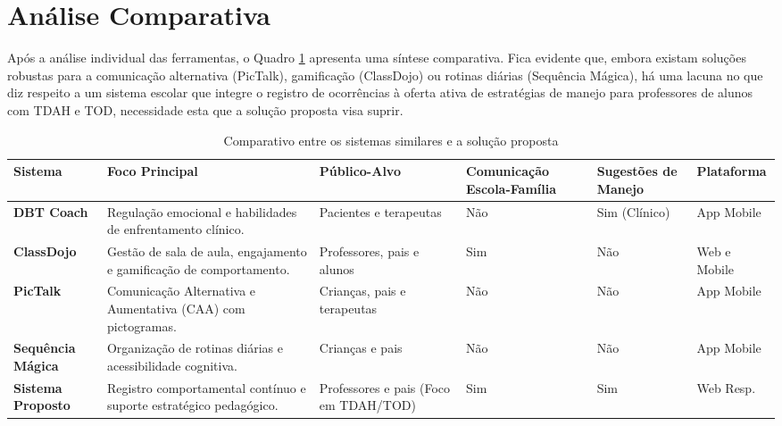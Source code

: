 \section{Análise Comparativa}

Após a análise individual das ferramentas, o Quadro \ref{quadro:comparativo_sistemas} apresenta uma síntese comparativa. Fica evidente que, embora existam soluções robustas para a comunicação alternativa (PicTalk), gamificação (ClassDojo) ou rotinas diárias (Sequência Mágica), há uma lacuna no que diz respeito a um sistema escolar que integre o registro de ocorrências à oferta ativa de estratégias de manejo para professores de alunos com TDAH e TOD, necessidade esta que a solução proposta visa suprir.

\begin{table}[H]
    \centering
    \caption{Comparativo entre os sistemas similares e a solução proposta}
    \label{quadro:comparativo_sistemas}
    \renewcommand{\arraystretch}{1.4} 
    \setlength{\tabcolsep}{3pt}
    \small 

    \begin{tabular}{|p{2.4cm}|p{3.8cm}|p{2.5cm}|p{2.4cm}|p{2.0cm}|p{1.8cm}|}
        \hline
        \textbf{Sistema} & \textbf{Foco Principal} & \textbf{Público-Alvo} & \textbf{Comunicação \newline Escola-Família} & \textbf{Sugestões \newline de Manejo} & \textbf{Plataforma} \\ \hline
        
        \textbf{DBT Coach} & Regulação emocional e habilidades de enfrentamento clínico. & Pacientes e terapeutas & Não & Sim (Clínico) & App Mobile \\ \hline
        
        \textbf{ClassDojo} & Gestão de sala de aula, engajamento e gamificação de comportamento. & Professores, pais e alunos & Sim & Não & Web e Mobile \\ \hline
        
        \textbf{PicTalk} & Comunicação Alternativa e Aumentativa (CAA) com pictogramas. & Crianças, pais e terapeutas & Não & Não & App Mobile \\ \hline
        
        \textbf{Sequência Mágica} & Organização de rotinas diárias e acessibilidade cognitiva. & Crianças e pais & Não & Não & App Mobile \\ \hline
        
        \textbf{Sistema Proposto} & Registro comportamental contínuo e suporte estratégico pedagógico. & Professores e pais \newline (Foco em TDAH/TOD) & Sim & Sim & Web Resp. \\ \hline
    \end{tabular}
    
    \vspace{0.2cm}
\end{table}

